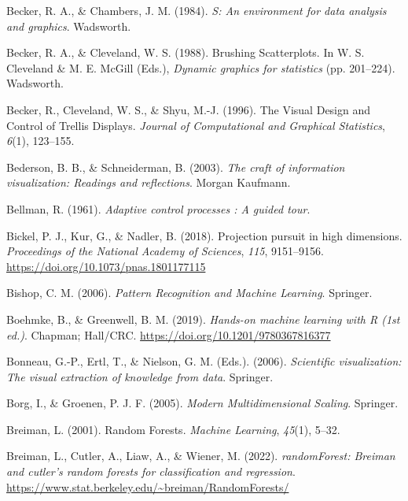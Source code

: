 \documentclass[
  letterpaper,
]{krantz}
\newlength{\cslhangindent}
\newenvironment{CSLReferences}[2] %
 {\begin{list}{}{%
  \setlength{\itemindent}{0pt}
  \setlength{\leftmargin}{0pt}
  \setlength{\parsep}{0pt}
  \ifodd #1
   \setlength{\leftmargin}{\cslhangindent}
   \setlength{\itemindent}{-1\cslhangindent}
  \fi
  \setlength{\itemsep}{#2\baselineskip}}}
 {\end{list}}
\begin{document}
\begin{CSLReferences}{1}{0}
Becker, R. A., \& Chambers, J. M. (1984). \emph{{S}: An environment for
data analysis and graphics}. Wadsworth.

Becker, R. A., \& Cleveland, W. S. (1988). {B}rushing {S}catterplots. In
W. S. Cleveland \& M. E. McGill (Eds.), \emph{Dynamic graphics for
statistics} (pp. 201--224). Wadsworth.

Becker, R., Cleveland, W. S., \& Shyu, M.-J. (1996). {T}he {V}isual
{D}esign and {C}ontrol of {T}rellis {D}isplays. \emph{Journal of
Computational and Graphical Statistics}, \emph{6}(1), 123--155.

Bederson, B. B., \& Schneiderman, B. (2003). \emph{The craft of
information visualization: Readings and reflections}. Morgan Kaufmann.

Bellman, R. (1961). \emph{Adaptive control processes : A guided tour}.

Bickel, P. J., Kur, G., \& Nadler, B. (2018). Projection pursuit in high
dimensions. \emph{Proceedings of the National Academy of Sciences},
\emph{115}, 9151--9156. \url{https://doi.org/10.1073/pnas.1801177115}

Bishop, C. M. (2006). \emph{Pattern {R}ecognition and {M}achine
{L}earning}. Springer.

Boehmke, B., \& Greenwell, B. M. (2019). \emph{Hands-on machine learning
with {R} (1st ed.)}. Chapman; Hall/CRC.
\url{https://doi.org/10.1201/9780367816377}

Bonneau, G.-P., Ertl, T., \& Nielson, G. M. (Eds.). (2006).
\emph{Scientific visualization: The visual extraction of knowledge from
data}. Springer.

Borg, I., \& Groenen, P. J. F. (2005). \emph{Modern {M}ultidimensional
{S}caling}. Springer.

Breiman, L. (2001). Random {F}orests. \emph{Machine Learning},
\emph{45}(1), 5--32.

Breiman, L., Cutler, A., Liaw, A., \& Wiener, M. (2022).
\emph{{randomForest}: Breiman and cutler's random forests for
classification and regression}.
\url{https://www.stat.berkeley.edu/~breiman/RandomForests/}


\end{CSLReferences}
\end{document}
